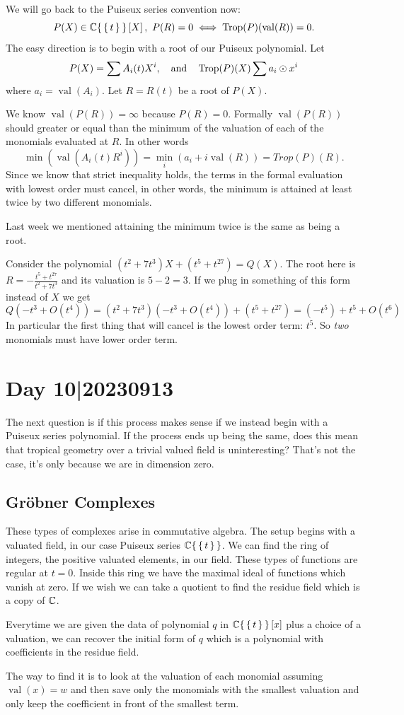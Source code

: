 \documentclass[12pt]{memoir}
\DeclareMathOperator{\val}{val}
\DeclareMathOperator{\Trop}{Trop}
\begin{document}
    We will go back to the Puiseux series convention now:
    $$P(X)\in\bC\set{\set{t}}\bonj{X},\ P(R)=0\iff \Trop(P)(\val(R))=0.$$
    The easy direction is to begin with a root of our Puiseux polynomial. Let 
    $$P(X)=\sum A_i(t)X^i,\word{and}\Trop(P)(X)\sum a_i\odot x^i$$
    where $a_i=\val(A_i)$. Let $R=R(t)$ be a root of $P(X)$.\par 
    We know $\val(P(R))=\infty$ because $P(R)=0$. Formally $\val(P(R))$ should greater or equal than the minimum of the valuation of each of the monomials evaluated at $R$. In other words 
    $$\min(\val(A_i(t)R^i))=\min_i(a_i+i\val(R))=Trop(P)(R).$$
    Since we know that strict inequality holds, the terms in the formal evaluation with lowest order must cancel, in other words, the minimum is attained at least twice by two different monomials.\par 
    Last week we mentioned attaining the minimum twice is the same as being a root.

    \begin{Ex}
        Consider the polynomial $(t^2+7t^3)X+(t^5+t^{27})=Q(X)$. The root here is $R=-\frac{t^5+t^{27}}{t^2+7t^3}$ and its valuation is $5-2=3$. If we plug in something of this form instead of $X$ we get 
        $$Q(-t^3+O(t^4))=(t^2+7t^3)(-t^3+O(t^4))+(t^5+t^{27})=(-t^5)+t^5+O(t^6)$$
        In particular the first thing that will cancel is the lowest order term: $t^5$. So \emph{two} monomials must have lower order term.
    \end{Ex}

\section{Day 10|20230913}

The next question is if this process makes sense if we instead begin with a Puiseux series polynomial. If the process ends up being the same, does this mean that tropical geometry over a trivial valued field is uninteresting? That's not the case, it's only because we are in dimension zero. 

\subsection{Gr\"obner Complexes}

These types of complexes arise in commutative algebra. The setup begins with a valuated field, in our case Puiseux series $\mathbb{C}\{\,\{\,t\,\}\,\}$. We can find the ring of integers, the positive valuated elements, in our field. These types of functions are regular at $t=0$. Inside this ring we have the maximal ideal of functions which vanish at zero. If we wish we can take a quotient to find the residue field which is a copy of $\mathbb{C}$.\par 
Everytime we are given the data of polynomial $q$ in $\mathbb{C}\{\,\{\,t\,\}\,\}\left\lbrack x\right\rbrack$ plus a choice of a valuation, we can recover the initial form of $q$ which is a polynomial with coefficients in the residue field.\par 
The way to find it is to look at the valuation of each monomial assuming $\val(x)=w$ and then save only the monomials with the smallest valuation and only keep the coefficient in front of the smallest term.
\end{document}
